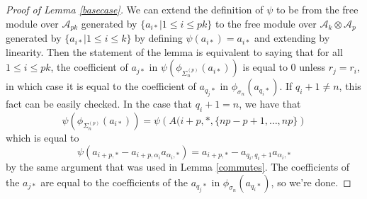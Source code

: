 \documentclass[11pt]{amsart}
\def\ltblue{blue!20!white}
\def\A{{\mathcal A}}
\def\s{{\sigma}}
\def\a{\alpha}
\newcommand\Sp{\Sigma^{(p)}}
\begin{document}
\begin{proof} [Proof of Lemma \ref{basecase}]\todo[color=\ltblue]{check}
We can extend the definition of $\psi$ to be from the free module over $\A_{pk}$ generated by $\{a_{i*}|1\le i\le pk\}$ to the free module over $\A_{k}\otimes \A_{p}$ generated by $\{a_{i*}|1\le i\le k\}$ by defining $\psi(a_{i*}) = a_{i*}$ and extending by linearity.  Then the statement of the lemma is equivalent to saying that for all $1\le i\le pk$, the coefficient of $a_{j*}$ in $\psi\left(\phi_{\Sp_n}(a_{i*})\right)$ is equal to 0 unless $r_j = r_i$, in which case it is equal to the coefficient of $a_{q_j*}$ in $\phi_{\s_n}(a_{q_i*})$.  If $q_i + 1 \ne n$, this fact can be easily checked.  In the case that $q_i + 1 = n$, we have that
$$\psi\left(\phi_{\Sp_n}(a_{i*})\right) = \psi\left(A(i+p,*,\{np-p+1,\ldots,np\}\right)$$
\noindent which is equal to
$$\psi(a_{i+p,*} - a_{i+p,\a_i}a_{\a_i,*}) = a_{i+p,*} - a_{q_i,q_i+1}a_{\a_i,*}$$
by the same argument that was used in Lemma \ref{commutes}.  The coefficients of the $a_{j*}$ are equal to the coefficients of the $a_{q_j*}$ in $\phi_{\s_n}(a_{q_i*})$, so we're done.
\end{proof}














\end{document}
